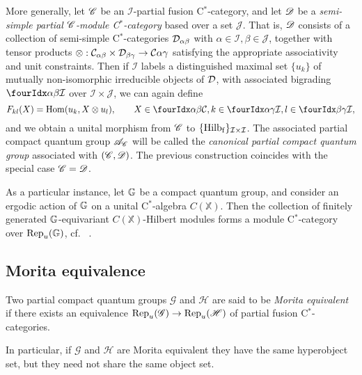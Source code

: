 \begin{Exa} More generally, let $\mathscr{C}$ be an $\mathscr{I}$-partial fusion C$^*$-category, and let $\mathscr{D}$ be a \emph{semi-simple partial $\mathscr{C}$-module C$^*$-category} based over a set $\mathscr{J}$. That is, $\mathscr{D}$ consists of a collection of semi-simple C$^*$-categories $\mathcal{D}_{\alpha\beta}$ with $\alpha\in \mathscr{I},\beta\in \mathscr{J}$, together with tensor products $\otimes: \mathcal{C}_{\alpha\beta}\times \mathcal{D}_{\beta\gamma}\rightarrow \mathcal{C}{\alpha\gamma}$ satisfying the appropriate associativity and unit constraints. Then if $\mathcal{I}$ labels a distinguished maximal set $\{u_k\}$ of mutually non-isomorphic irreducible objects of $\mathcal{D}$, with associated bigrading $\Gru{\mathcal{I}}{\alpha}{\beta}$ over $\mathscr{I}\times \mathscr{J}$, we can again define \[F_{kl}(X)  = \Hom(u_k,  X\otimes u_l),\qquad X\in \Gru{\CatC}{\alpha}{\beta}, k\in \Gru{\mathcal{I}}{\alpha}{\gamma},l\in \Gru{\mathcal{I}}{\beta}{\gamma},\] and we obtain a unital morphism from $\mathscr{C}$ to $\{\mathrm{Hilb}_{\operatorname{\mathrm{f}}}\}_{\mathcal{I}\times \mathcal{I}}$. The associated partial compact quantum group $\mathscr{A}_{\mathscr{C}}$ will be called the \emph{canonical partial compact quantum group} associated with $(\mathscr{C},\mathscr{D})$. The previous construction coincides with the special case $\mathscr{C}= \mathscr{D}$.
\end{Exa}

\begin{Exa}\label{ExaErgo} As a particular instance, let $\mathbb{G}$ be a compact quantum group, and consider an ergodic action of $\mathbb{G}$ on a unital C$^*$-algebra $C(\mathbb{X})$. Then the collection of finitely generated $\mathbb{G}$-equivariant $C(\mathbb{X})$-Hilbert modules forms a module C$^*$-category over $\mathrm{Rep}_u(\mathbb{G})$, cf.~ \cite{DCY1}. 
\end{Exa}

\subsection{Morita equivalence}


\begin{Def} Two partial compact quantum groups $\mathscr{G}$ and $\mathscr{H}$ are said to be \emph{Morita equivalent} if there exists an equivalence $\mathrm{Rep}_u(\mathscr{G}) \rightarrow \mathrm{Rep}_u(\mathscr{H})$ of partial fusion C$^*$-categories. 
\end{Def} 

In particular, if $\mathscr{G}$ and $\mathscr{H}$ are Morita equivalent they have the same hyperobject set, but they need not share the same object set.

